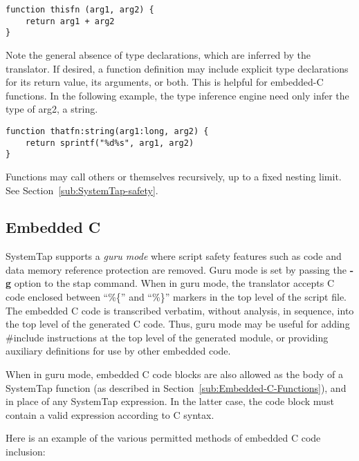 \documentclass[twoside,english]{article}
\newenvironment{vindent}
{\begin{list}{}{\setlength{\listparindent}{6pt}}
\item[]}
{\end{list}}
\begin{document}
\begin{vindent}
\begin{verbatim}
function thisfn (arg1, arg2) {
    return arg1 + arg2
}
\end{verbatim}
\end{vindent}

Note the general absence of type declarations, which are inferred by the
translator. If desired, a function definition may include explicit type declarations
for its return value, its arguments, or both. This is helpful for embedded-C
functions. In the following example, the type inference engine need only
infer the type of arg2, a string.

\begin{vindent}
\begin{verbatim}
function thatfn:string(arg1:long, arg2) {
    return sprintf("%d%s", arg1, arg2)
}
\end{verbatim}
\end{vindent}

Functions may call others or themselves recursively, up to a fixed nesting
limit. See Section~\ref{sub:SystemTap-safety}.


\subsection{Embedded C\label{sub:Embedded-C}}
SystemTap supports a \emph{guru mode} where script
safety features such as code and data memory reference protection are
removed. Guru mode is set by passing the \textbf{-g} option to the
stap command. When in guru mode, the translator accepts C code
enclosed between {}``\%\{'' and {}``\%\}'' markers in the top level of
the script file. The embedded C code is transcribed verbatim, without
analysis, in sequence, into the top level of the generated C
code. Thus, guru mode may be useful for adding \#include instructions
at the top level of the generated module, or providing auxiliary
definitions for use by other embedded code.

When in guru mode, embedded C code blocks are also allowed as the body
of a SystemTap function (as described in
Section~\ref{sub:Embedded-C-Functions}), and in place of any SystemTap
expression. In the latter case, the code block must contain a valid
expression according to C syntax.

Here is an example of the various permitted methods of embedded C code inclusion:
\end{document}
